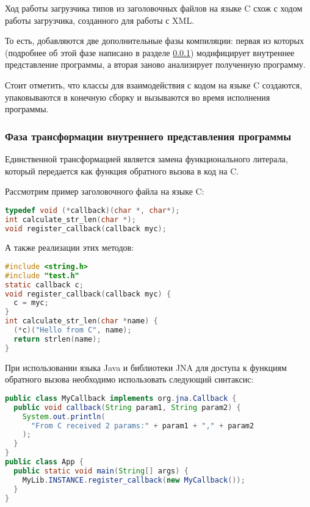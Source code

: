 Ход работы загрузчика типов из заголовочных файлов на языке C схож с ходом работы загрузчика, созданного для работы с XML.

То есть, добавляются две дополнительные фазы компиляции: первая из которых (подробнее об этой фазе написано в разделе \ref{c-tranformation-phase}) модифицирует внутреннее представление программы, а вторая заново анализирует полученную программу.

Стоит отметить, что классы для взаимодействия с кодом на языке C создаются, упаковываются в конечную сборку и вызываются во время исполнения программы.

\subsubsection{Фаза трансформации внутреннего представления программы}\label{c-tranformation-phase}
Единственной трансформацией является замена функционального литерала, который передается как функция обратного вызова в код на C.

Рассмотрим пример заголовочного файла на языке C:

\begin{code}\begin{lstlisting}[language=C, caption={Пример заголовочного файла на языке C с декларацией функции обратного вызова.}, label=callback-c-example]
typedef void (*callback)(char *, char*);
int calculate_str_len(char *);
void register_callback(callback myc);
\end{lstlisting}\end{code}

А также реализации этих методов:
\begin{code}\begin{lstlisting}[language=C, caption={Реализация функции обратного вызова из примера~\ref{callback-c-example}.}, label=callback-c-example-impl]
#include <string.h>
#include "test.h"
static callback c;
void register_callback(callback myc) {
  c = myc;
}
int calculate_str_len(char *name) {
  (*c)("Hello from C", name);
  return strlen(name);
}
\end{lstlisting}\end{code}

При использовании языка Java и библиотеки JNA для доступа к функциям обратного вызова необходимо использовать следующий синтаксис:
\begin{code}\begin{lstlisting}[language=Java, caption={Пример передачи функции обратного вызова в языке Java с использованием библиотеки JNA.}, label=java-callback-example]
public class MyCallback implements org.jna.Callback {
  public void callback(String param1, String param2) {
    System.out.println(
      "From C received 2 params:" + param1 + "," + param2
    );
  }
}
public class App {
  public static void main(String[] args) {
    MyLib.INSTANCE.register_callback(new MyCallback());
  }
}
\end{lstlisting}\end{code}


